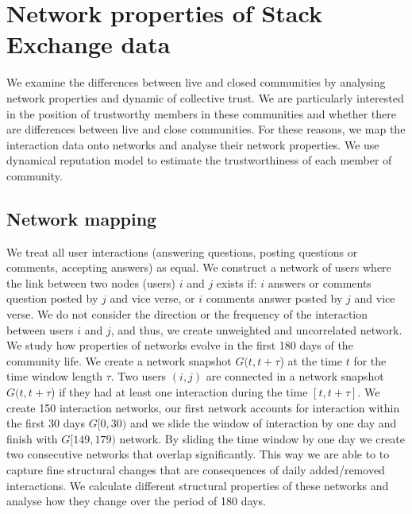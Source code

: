 \section{Network properties of Stack Exchange data}

We examine the differences between live and closed communities by analysing network properties and dynamic of collective trust. We are particularly interested in the position of trustworthy members in these communities and whether there are differences between live and close communities. For these reasons, we map the interaction data onto networks and analyse their network properties. We use dynamical reputation model to estimate the trustworthiness of each member of community.     

\subsection{Network mapping}

We treat all user interactions (answering questions, posting questions or comments, accepting answers) as equal. We construct a network of users where the link between two nodes (users) $i$ and $j$ exists if: $i$ answers or comments question posted by $j$ and vice verse, or $i$ comments answer posted by $j$ and vice verse. We do not consider the direction or the frequency of the interaction between users $i$ and $j$, and thus, we create unweighted and uncorrelated network. 
We study how properties of networks evolve in the first 180 days of the community life. We create a network snapshot $G(t, t+\tau$) at the time $t$ for the time window length $\tau$. Two users $(i, j)$ are connected in a network snapshot $G(t, t+\tau$) if they had at least one interaction during the time $[t,t+\tau]$. We create 150 interaction networks, our first network accounts for interaction within the first 30 days $G[0,30)$ and we slide the window of interaction by one day and finish with $G[149,179)$ network. By sliding the time window by one day we create two consecutive networks that overlap significantly. This way we are able to to capture fine structural changes that are consequences of daily added/removed interactions. We calculate different structural properties of these networks and analyse how they change over the period of 180 days.  


